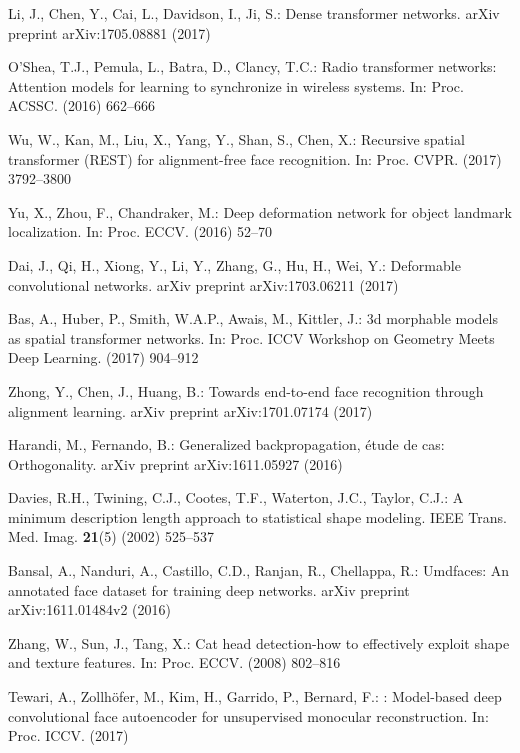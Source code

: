 \documentclass[runningheads]{llncs}
\begin{document}
\begin{thebibliography}{10}
Li, J., Chen, Y., Cai, L., Davidson, I., Ji, S.:
\newblock Dense transformer networks.
\newblock arXiv preprint arXiv:1705.08881 (2017)

O'Shea, T.J., Pemula, L., Batra, D., Clancy, T.C.:
\newblock Radio transformer networks: Attention models for learning to
  synchronize in wireless systems.
\newblock In: Proc. ACSSC. (2016)  662--666

Wu, W., Kan, M., Liu, X., Yang, Y., Shan, S., Chen, X.:
\newblock Recursive spatial transformer ({REST}) for alignment-free face
  recognition.
\newblock In: Proc. CVPR. (2017)  3792--3800

Yu, X., Zhou, F., Chandraker, M.:
\newblock Deep deformation network for object landmark localization.
\newblock In: Proc. ECCV. (2016)  52--70

Dai, J., Qi, H., Xiong, Y., Li, Y., Zhang, G., Hu, H., Wei, Y.:
\newblock Deformable convolutional networks.
\newblock arXiv preprint arXiv:1703.06211 (2017)

Bas, A., Huber, P., Smith, W.A.P., Awais, M., Kittler, J.:
\newblock 3d morphable models as spatial transformer networks.
\newblock In: Proc. ICCV Workshop on Geometry Meets Deep Learning. (2017)
  904--912

Zhong, Y., Chen, J., Huang, B.:
\newblock Towards end-to-end face recognition through alignment learning.
\newblock arXiv preprint arXiv:1701.07174 (2017)

Harandi, M., Fernando, B.:
\newblock Generalized backpropagation, {\'e}tude de cas: Orthogonality.
\newblock arXiv preprint arXiv:1611.05927 (2016)

Davies, R.H., Twining, C.J., Cootes, T.F., Waterton, J.C., Taylor, C.J.:
\newblock A minimum description length approach to statistical shape modeling.
\newblock IEEE Trans. Med. Imag. \textbf{21}(5) (2002)  525--537

Bansal, A., Nanduri, A., Castillo, C.D., Ranjan, R., Chellappa, R.:
\newblock Umdfaces: An annotated face dataset for training deep networks.
\newblock arXiv preprint arXiv:1611.01484v2 (2016)

Zhang, W., Sun, J., Tang, X.:
\newblock Cat head detection-how to effectively exploit shape and texture
  features.
\newblock In: Proc. ECCV. (2008)  802--816

Tewari, A., Zollh{\"o}fer, M., Kim, H., Garrido, P., Bernard, F.:
: Model-based deep convolutional face autoencoder for
  unsupervised monocular reconstruction.
\newblock In: Proc. ICCV. (2017)

\end{thebibliography}
%
\end{document}
